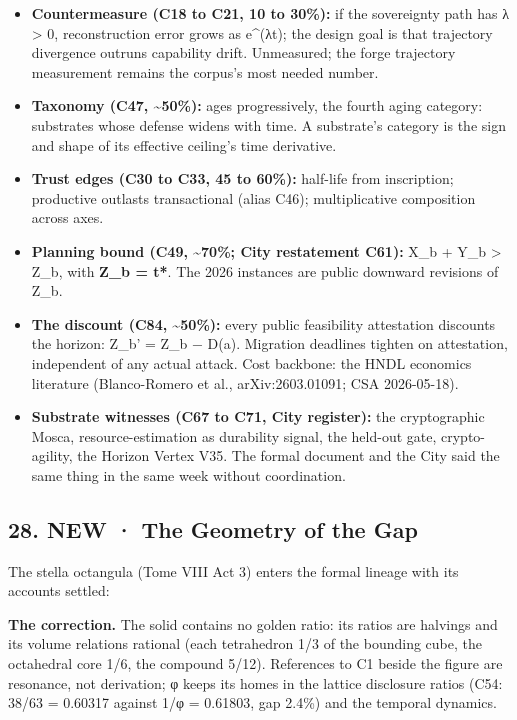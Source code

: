 \documentclass[
]{article}
\providecommand{\tightlist}{%
  \setlength{\itemsep}{0pt}\setlength{\parskip}{0pt}}
\begin{document}
\begin{itemize}
\tightlist
\item
  \textbf{Countermeasure (C18 to C21, 10 to 30\%):} if the sovereignty
  path has λ \textgreater{} 0, reconstruction error grows as e\^{}(λt);
  the design goal is that trajectory divergence outruns capability
  drift. Unmeasured; the forge trajectory measurement remains the
  corpus's most needed number.
\item
  \textbf{Taxonomy (C47, \textasciitilde50\%):} ages progressively, the
  fourth aging category: substrates whose defense widens with time. A
  substrate's category is the sign and shape of its effective ceiling's
  time derivative.
\item
  \textbf{Trust edges (C30 to C33, 45 to 60\%):} half-life from
  inscription; productive outlasts transactional (alias C46);
  multiplicative composition across axes.
\item
  \textbf{Planning bound (C49, \textasciitilde70\%; City restatement
  C61):} X\_b + Y\_b \textgreater{} Z\_b, with \textbf{Z\_b = t*}. The
  2026 instances are public downward revisions of Z\_b.
\item
  \textbf{The discount (C84, \textasciitilde50\%):} every public
  feasibility attestation discounts the horizon: Z\_b' = Z\_b − D(a).
  Migration deadlines tighten on attestation, independent of any actual
  attack. Cost backbone: the HNDL economics literature (Blanco-Romero et
  al., arXiv:2603.01091; CSA 2026-05-18).
\item
  \textbf{Substrate witnesses (C67 to C71, City register):} the
  cryptographic Mosca, resource-estimation as durability signal, the
  held-out gate, crypto-agility, the Horizon Vertex V35. The formal
  document and the City said the same thing in the same week without
  coordination.
\end{itemize}

\subsection{28. NEW · The Geometry of the
Gap}\label{new-the-geometry-of-the-gap}

The stella octangula (Tome VIII Act 3) enters the formal lineage with
its accounts settled:

\textbf{The correction.} The solid contains no golden ratio: its ratios
are halvings and its volume relations rational (each tetrahedron 1/3 of
the bounding cube, the octahedral core 1/6, the compound 5/12).
References to C1 beside the figure are resonance, not derivation; φ
keeps its homes in the lattice disclosure ratios (C54: 38/63 = 0.60317
against 1/φ = 0.61803, gap 2.4\%) and the temporal dynamics.
\end{document}
